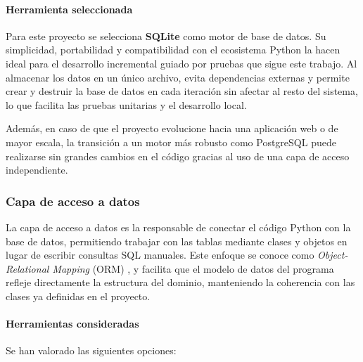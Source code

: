 \paragraph{Herramienta seleccionada}
Para este proyecto se selecciona \textbf{SQLite} como motor de base de datos.  
Su simplicidad, portabilidad y compatibilidad con el ecosistema Python la hacen ideal para el desarrollo incremental
guiado por pruebas que sigue este trabajo. Al almacenar los datos en un único archivo, evita dependencias externas
y permite crear y destruir la base de datos en cada iteración sin afectar al resto del sistema, lo que facilita las
pruebas unitarias y el desarrollo local.

Además, en caso de que el proyecto evolucione hacia una aplicación web o de mayor escala, la transición a un motor
más robusto como PostgreSQL puede realizarse sin grandes cambios en el código gracias al uso de una capa de acceso
independiente.

\subsubsection{Capa de acceso a datos}
La capa de acceso a datos es la responsable de conectar el código Python con la base de datos, permitiendo trabajar 
con las tablas mediante clases y objetos en lugar de escribir consultas SQL manuales. Este enfoque se conoce como 
\textit{Object-Relational Mapping} (ORM) \cite{fowlerPatterns}, y facilita que el modelo de datos del programa 
refleje directamente la estructura del dominio, manteniendo la coherencia con las clases ya definidas en el proyecto.

\paragraph{Herramientas consideradas}
Se han valorado las siguientes opciones:

